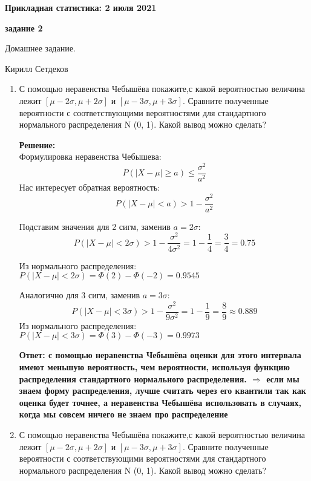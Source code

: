 \documentclass[a4paper,12pt]{article}
\renewcommand{\leq}{\leqslant}
\renewcommand{\geq}{\geqslant}
\newcounter{z}
\renewcommand{\date}{{\bf 2 июля 2021}}
\newcommand{\HSEhat}{
\vspace*{-0pt}
\noindent
\setcounter{z}{0}


{\bf \phantom{\date}  \large \hfill Прикладная статистика: \hfill \normalsize \date}

\vspace{5 pt}
{\bf \large \hfill  задание 2\hfill }

\vspace{15 pt}
\centerline{ \large  Домашнее задание.}
\centerline{ \large  Кирилл Сетдеков}



\vspace*{10pt}
\setcounter{z}{0}

}
\begin{document}
\HSEhat


\begin{enumerate}

\subsection*{Задачи:}

\item С помощью неравенства Чебышёва покажите,с какой вероятностью величина лежит $[\mu - 2 \sigma, \mu + 2 \sigma]$ и  $[\mu -3 \sigma, \mu +3 \sigma]$.
Сравните полученные вероятности с соответствующими вероятностями для стандартного нормального распределения N (0, 1). Какой вывод можно сделать?

\textbf{Решение:}\\
Формулировка неравенства Чебышева:
$$P(|X-\mu| \geq a) \leq \frac{\sigma ^2 }{a^2}$$
Нас интересует обратная вероятность:
$$P(|X-\mu| < a) > 1- \frac{\sigma ^2 }{a^2}$$

Подставим значения для 2 сигм, заменив $a = 2 \sigma$:
$$P(|X-\mu| < 2 \sigma) > 1 - \frac{\sigma ^2 }{4 \sigma^2} = 1-\frac{1}{4} = \frac{3}{4}=0.75$$

Из нормального распределения: $P(|X-\mu| < 2 \sigma) = \Phi(2) - \Phi(-2) = 0.9545$

Аналогично для 3 сигм, заменив $a = 3 \sigma$:
$$P(|X-\mu| < 3 \sigma) > 1 - \frac{\sigma ^2 }{9 \sigma^2} = 1-\frac{1}{9} = \frac{8}{9} \approx 0.889$$
Из нормального распределения: $P(|X-\mu| < 3 \sigma) = \Phi(3) - \Phi(-3) = 0.9973$

\textbf{Ответ: с помощью неравенства Чебышёва оценки для этого интервала имеют меньшую вероятность, чем вероятности, используя функцию распределения стандартного нормального распределения. $\Rightarrow$ если мы знаем форму распределения, лучше считать через его квантили так как оценка будет точнее, а неравенства Чебышёва использовать в случаях, когда мы совсем ничего не знаем про распределение} 

\item С помощью неравенства Чебышёва покажите,с какой вероятностью величина лежит $[\mu - 2 \sigma, \mu + 2 \sigma]$ и  $[\mu -3 \sigma, \mu +3 \sigma]$.
Сравните полученные вероятности с соответствующими вероятностями для стандартного нормального распределения N (0, 1). Какой вывод можно сделать?

\end{enumerate}
\end{document}
